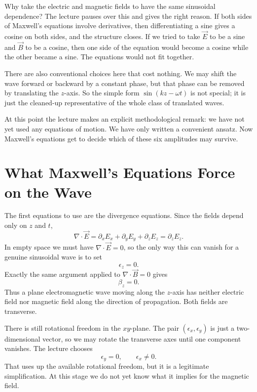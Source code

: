 Why take the electric and magnetic fields to have the same sinusoidal dependence? The lecture pauses over this and gives the right reason. If both sides of Maxwell's equations involve derivatives, then differentiating a sine gives a cosine on both sides, and the structure closes. If we tried to take \(\vec E\) to be a sine and \(\vec B\) to be a cosine, then one side of the equation would become a cosine while the other became a sine. The equations would not fit together.

There are also conventional choices here that cost nothing. We may shift the wave forward or backward by a constant phase, but that phase can be removed by translating the \(z\)-axis. So the simple form \(\sin(kz-\omega t)\) is not special; it is just the cleaned-up representative of the whole class of translated waves.

At this point the lecture makes an explicit methodological remark: we have not yet used any equations of motion. We have only written a convenient ansatz. Now Maxwell's equations get to decide which of these six amplitudes may survive.

\section{What Maxwell's Equations Force on the Wave}

The first equations to use are the divergence equations. Since the fields depend only on \(z\) and \(t\),
\begin{equation}
\nabla\cdot \vec E
=
\partial_x E_x+\partial_y E_y+\partial_z E_z
=
\partial_z E_z.
\end{equation}
In empty space we must have \(\nabla\cdot\vec E=0\), so the only way this can vanish for a genuine sinusoidal wave is to set
\begin{equation}
\epsilon_z=0.
\end{equation}
Exactly the same argument applied to \(\nabla\cdot\vec B=0\) gives
\begin{equation}
\beta_z=0.
\end{equation}
Thus a plane electromagnetic wave moving along the \(z\)-axis has neither electric field nor magnetic field along the direction of propagation. Both fields are transverse.

There is still rotational freedom in the \(xy\)-plane. The pair \((\epsilon_x,\epsilon_y)\) is just a two-dimensional vector, so we may rotate the transverse axes until one component vanishes. The lecture chooses
\begin{equation}
\epsilon_y=0,
\qquad
\epsilon_x\neq 0.
\end{equation}
That uses up the available rotational freedom, but it is a legitimate simplification. At this stage we do not yet know what it implies for the magnetic field.

